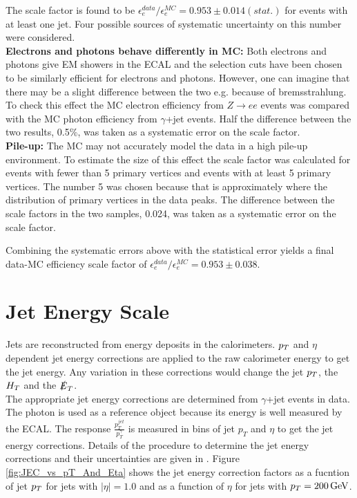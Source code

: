 
The scale factor is found to be $\epsilon_{e}^{data}/\epsilon_{e}^{MC} =
0.953\pm 0.014(stat.)$ for events with at least one jet. Four possible sources
of systematic uncertainty on this number were considered. \\

{\bf Electrons and photons behave differently in MC:} Both electrons and photons
give EM showers in the ECAL and the selection cuts have been chosen to be
similarly efficient for electrons and photons. However, one can imagine that
there may be a slight difference between the two e.g. because of bremsstrahlung.
To check this effect the MC electron efficiency from $Z\rightarrow ee$ events
was compared with the MC photon efficiency from $\gamma$+jet events. Half the
difference between the two results, 0.5\%, was taken as a systematic error on
the scale factor. \\

{\bf Pile-up:} The MC may not accurately model the data in a high pile-up
environment. To estimate the size of this effect the scale factor was calculated
for events with fewer than 5 primary vertices and events with at least 5 primary
vertices. The number 5 was chosen because that is approximately where the 
distribution of primary vertices in the data peaks. The difference between the
scale factors in the two samples, 0.024, was taken as a systematic error on the 
scale factor. \\

{\bf }

Combining the systematic errors above with the statistical error yields a final
data-MC efficiency scale factor of $\epsilon_{e}^{data}/\epsilon_{e}^{MC} =
0.953\pm0.038$.

\section{Jet Energy Scale}

Jets are reconstructed from energy deposits in the calorimeters. $p_{T}$ and
$\eta$ dependent jet energy corrections are applied to the raw calorimeter 
energy to get the jet energy. Any variation in these corrections would change 
the jet $p_{T}$, the $H_{T}$ and the $\slashed{E}_{T}$. \\

The appropriate jet energy corrections are determined from $\gamma$+jet events
in data. The photon is used as a reference object because its energy is well 
measured by the ECAL. The response $\frac{p_{T}^{jet}}{p_{T}^{\gamma}}$
is measured in bins of jet $p_{T}$ and $\eta$ to get the jet energy corrections. 
Details of the procedure to determine the jet energy corrections and their 
uncertainties are given in \cite{jec}. Figure \ref{fig:JEC_vs_pT_And_Eta} shows 
the jet energy correction factors as a fucntion of jet $p_{T}$ for jets with 
$|\eta| = 1.0$ and as a function of $\eta$ for jets with $p_{T} = 200 \, \mathrm{GeV}$. 
\\

